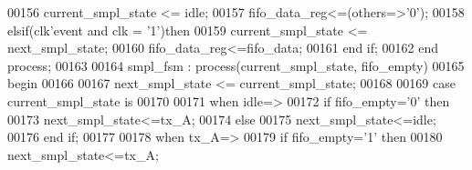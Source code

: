 \begin{DoxyCode}
00156         \textcolor{vhdlchar}{current_smpl_state} \textcolor{vhdlchar}{<=} \textcolor{vhdlchar}{idle};
00157         \textcolor{vhdlchar}{fifo_data_reg}\textcolor{vhdlchar}{<=}\textcolor{vhdlchar}{(}\textcolor{keywordflow}{others}\textcolor{vhdlchar}{=}\textcolor{vhdlchar}{>}\textcolor{vhdlchar}{'}\textcolor{vhdllogic}{}\textcolor{vhdllogic}{0}\textcolor{vhdlchar}{'}\textcolor{vhdlchar}{)};
00158     \textcolor{keywordflow}{elsif}\textcolor{vhdlchar}{(}\textcolor{vhdlchar}{clk}\textcolor{vhdlchar}{'}\textcolor{vhdlkeyword}{event} \textcolor{keywordflow}{and} \textcolor{vhdlchar}{clk} \textcolor{vhdlchar}{=} \textcolor{vhdlchar}{'}\textcolor{vhdllogic}{}\textcolor{vhdllogic}{1}\textcolor{vhdlchar}{'}\textcolor{vhdlchar}{)}\textcolor{keywordflow}{then}
00159         \textcolor{vhdlchar}{current_smpl_state} \textcolor{vhdlchar}{<=} \textcolor{vhdlchar}{next_smpl_state};
00160         \textcolor{vhdlchar}{fifo_data_reg}\textcolor{vhdlchar}{<=}\textcolor{vhdlchar}{fifo_data};
00161     \textcolor{keywordflow}{end} \textcolor{keywordflow}{if}; 
00162 \textcolor{keywordflow}{end} \textcolor{keywordflow}{process};
00163 
00164 smpl\_fsm : \textcolor{keywordflow}{process}(current_smpl_state, fifo_empty)
00165 \textcolor{vhdlkeyword}{begin}
00166   
00167     \textcolor{vhdlchar}{next_smpl_state} \textcolor{vhdlchar}{<=} \textcolor{vhdlchar}{current_smpl_state};
00168     
00169     \textcolor{keywordflow}{case} \textcolor{vhdlchar}{current_smpl_state} \textcolor{keywordflow}{is}
00170 
00171       \textcolor{keywordflow}{when} \textcolor{vhdlchar}{idle}\textcolor{vhdlchar}{=}\textcolor{vhdlchar}{>}
00172        \textcolor{keywordflow}{if} \textcolor{vhdlchar}{fifo_empty}\textcolor{vhdlchar}{=}\textcolor{vhdlchar}{'}\textcolor{vhdllogic}{}\textcolor{vhdllogic}{0}\textcolor{vhdlchar}{'} \textcolor{keywordflow}{then}
00173           \textcolor{vhdlchar}{next_smpl_state}\textcolor{vhdlchar}{<=}\textcolor{vhdlchar}{tx\_A};
00174       \textcolor{keywordflow}{else}
00175           \textcolor{vhdlchar}{next_smpl_state}\textcolor{vhdlchar}{<=}\textcolor{vhdlchar}{idle};
00176       \textcolor{keywordflow}{end} \textcolor{keywordflow}{if}; 
00177    
00178       \textcolor{keywordflow}{when} \textcolor{vhdlchar}{tx\_A}\textcolor{vhdlchar}{=}\textcolor{vhdlchar}{>} 
00179           \textcolor{keywordflow}{if} \textcolor{vhdlchar}{fifo_empty}\textcolor{vhdlchar}{=}\textcolor{vhdlchar}{'}\textcolor{vhdllogic}{}\textcolor{vhdllogic}{1}\textcolor{vhdlchar}{'} \textcolor{keywordflow}{then}
00180               \textcolor{vhdlchar}{next_smpl_state}\textcolor{vhdlchar}{<=}\textcolor{vhdlchar}{tx\_A};           

\end{DoxyCode}
